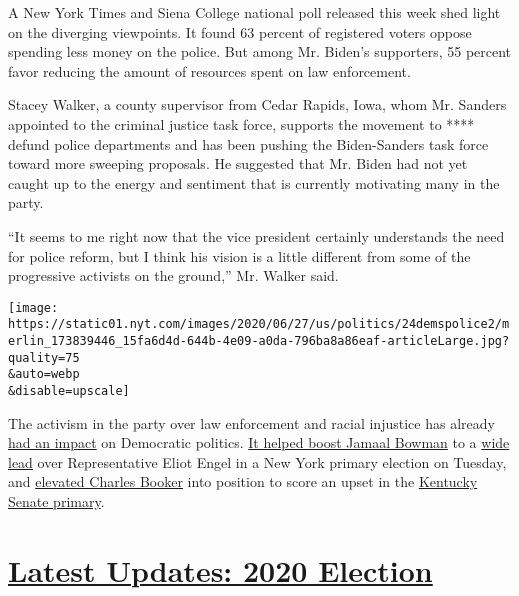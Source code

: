 A New York Times and Siena College national poll released this week shed
light on the diverging viewpoints. It found 63 percent of registered
voters oppose spending less money on the police. But among Mr. Biden's
supporters, 55 percent favor reducing the amount of resources spent on
law enforcement.

Stacey Walker, a county supervisor from Cedar Rapids, Iowa, whom Mr.
Sanders appointed to the criminal justice task force, supports the
movement to **** defund police departments and has been pushing the
Biden-Sanders task force toward more sweeping proposals. He suggested
that Mr. Biden had not yet caught up to the energy and sentiment that is
currently motivating many in the party.

``It seems to me right now that the vice president certainly understands
the need for police reform, but I think his vision is a little different
from some of the progressive activists on the ground,'' Mr. Walker said.

\texttt{[image: https://static01.nyt.com/images/2020/06/27/us/politics/24demspolice2/merlin\_173839446\_15fa6d4d-644b-4e09-a0da-796ba8a86eaf-articleLarge.jpg?quality=75\\\&auto=webp\\\&disable=upscale]}

The activism in the party over law enforcement and racial injustice has
already
\href{https://www.nytimes.com/2020/06/26/us/politics/charles-booker-kentucky-jamaal-bowman.html}{had
an impact} on Democratic politics.
\href{https://www.nytimes.com/2020/06/24/nyregion/ny-primary-election-results.html}{It
helped boost Jamaal Bowman} to a
\href{https://www.nytimes.com/interactive/2020/06/23/us/elections/results-new-york-house-district-16-primary-election.html}{wide
lead} over Representative Eliot Engel in a New York primary election on
Tuesday, and
\href{https://www.nytimes.com/2020/06/23/us/politics/kentucky-new-york-election-recap.html}{elevated
Charles Booker} into position to score an upset in the
\href{https://www.nytimes.com/interactive/2020/06/23/us/elections/results-kentucky-senate-primary-election.html}{Kentucky
Senate primary}.

\hypertarget{latest-updates-2020-election}{%
\section{\texorpdfstring{\href{https://www.nytimes.com/2020/08/04/us/elections/primary-election-michigan-arizona-kansas.html?action=click\&pgtype=Article\&state=default\&region=MAIN_CONTENT_1\&context=storylines_live_updates}{Latest
Updates: 2020
Election}}{Latest Updates: 2020 Election}}\label{latest-updates-2020-election}}

